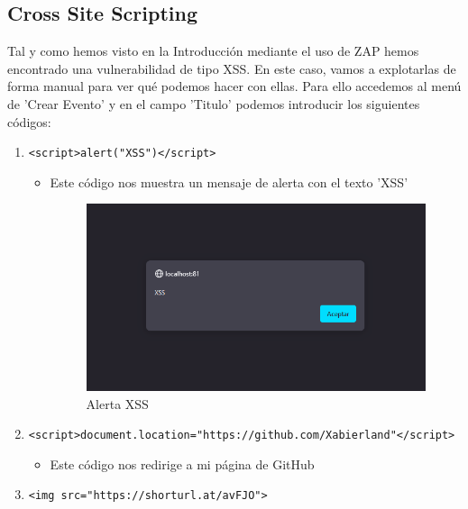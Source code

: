 \documentclass{report}
\begin{document}
            \subsection{Cross Site Scripting}
                Tal y como hemos visto en la Introducción mediante el uso de ZAP hemos encontrado una vulnerabilidad de tipo XSS.
                En este caso, vamos a explotarlas de forma manual para ver qué podemos hacer con ellas.
                Para ello accedemos al menú de 'Crear Evento' y en el campo 'Titulo' podemos introducir los siguientes códigos:
                \begin{enumerate}
                    \item \texttt{<script>alert("XSS")</script>}
                    \begin{itemize}
                        \item Este código nos muestra un mensaje de alerta con el texto 'XSS'
                        \begin{figure}[H]
                            \centering
                            \includegraphics[width=1\textwidth]{./img/vulnerabilidades/2.3/2.1.png}
                            \caption{Alerta XSS}
                        \end{figure}
                    \end{itemize}
                    \item \texttt{<script>document.location="https://github.com/Xabierland"</script>}
                    \begin{itemize}
                        \item Este código nos redirige a mi página de GitHub
                    \end{itemize}
                    \item \texttt{<img src="https://shorturl.at/avFJO">}

\end{enumerate}
\end{document}
